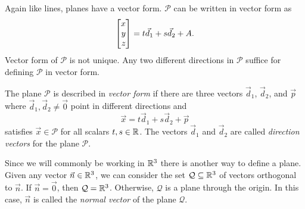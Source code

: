 Again like lines, planes have a vector form.  $\mathcal P$ can be written in vector form as
\[
	\mat{x\\y\\z} = t\vec d_1+s\vec d_2+A.
\]
Vector form of $\mathcal P$ is not unique.  Any two different directions in $\mathcal P$
suffice for defining $\mathcal P$ in vector form.

\begin{center}
\end{center}

\begin{definition}
	The plane $\mathcal P$ is described in \emph{vector form} if there are
	three vectors $\vec d_1$, $\vec d_2$, and $\vec p$ where $\vec d_1,\vec d_2\neq \vec 0$
	point in different directions and
	\[
		\vec x=t\vec d_1+s\vec d_2+\vec p
	\]
	satisfies $\vec x\in \mathcal P$ for all scalars $t,s\in\mathbb{R}$.  The vectors $\vec d_1$
	and $\vec d_2$ are called \emph{direction vectors} for the plane $\mathcal P$.
\end{definition}

Since we will commonly be working in $\mathbb{R}^3$ there is another way to define a plane.  Given
any vector $\vec n\in\mathbb{R}^3$, we can consider the set $\mathcal Q\subseteq\mathbb{R}^3$ of vectors orthogonal to $\vec n$.
If $\vec n=\vec 0$, then $\mathcal Q=\mathbb{R}^3$.  Otherwise, $\mathcal Q$ is a plane through the origin.
In this case, $\vec n$ is called the \emph{normal vector} of the plane $\mathcal Q$.


